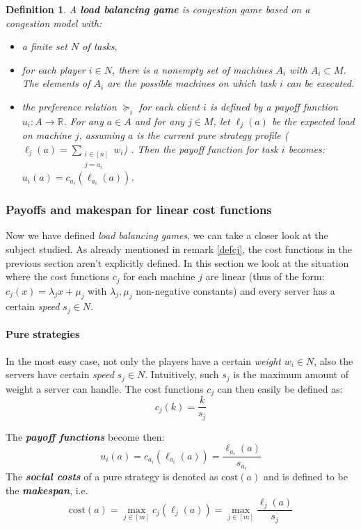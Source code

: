 \documentclass[a4paper,11pt]{article}
\newtheorem{definition}[theorem]{Definition}
\newcommand{\R}{{\mathbb R}}
\newcommand{\cost}{\text{cost}}
\begin{document}
\begin{definition}\cite{9}
A \textbf{load balancing game} is congestion game based on a congestion model with:
\begin{itemize}
  \item a finite set $N$ of tasks,
  \item for each player $i \in N$, there is a nonempty set of machines $A_i$ with $A_i \subset M$. The elements of $A_i$ are the possible machines on which task $i$ can be executed.
  \item the preference relation $\succeq_i$ for each client $i$ is defined by a payoff function $u_i: A \rightarrow \R$. For any $a \in A$ and for any $j \in M$, let $\ell_j(a)$ be \emph{the expected load on machine} $j$, assuming $a$ is the current pure strategy profile ($\ell_j(a) = \sum_{\substack{i \in [n]\\j = a_i}}{w_i}$) . Then the payoff function for task $i$ becomes: $u_i(a) = c_{a_i}(\ell_{a_i}(a))$.


\end{itemize}
\end{definition}


\subsubsection{Payoffs and makespan for linear cost functions}\label{expdefcj}
Now we have defined \emph{load balancing games}, we can take a closer look at the subject studied. As already mentioned in remark \ref{defcj}, the cost functions in the previous section aren't explicitly defined. In this section we look at the situation where the cost functions $c_j$ for each machine $j$ are linear (thus of the form: $c_j(x) = \lambda_jx+\mu_j$ with $\lambda_j, \mu_j$ non-negative constants) and every server has a certain \emph{speed} $s_j \in N$.

\paragraph{Pure strategies}
In the most easy case, not only the players have a certain \emph{weight} $w_i \in N$, also the servers have certain \emph{speed} $s_j \in N$. Intuitively, such $s_j$ is the maximum amount of weight a server can handle. The cost functions $c_j$ can then easily be defined as:
$$c_j(k) = \frac{k}{s_j}$$

 The \textbf{\emph{payoff functions}} become then:
$$u_i(a) = c_{a_i}(\ell_{a_i}(a)) =  \frac{\ell_{a_i}(a)}{s_{a_i}}$$
The \emph{\textbf{social costs}} of a pure strategy is denoted as $\cost(a)$ and is defined to be the \emph{\textbf{makespan}}, i.e. $$\cost(a)=\max_{j\in[m]}{c_j(\ell_j(a))} = \max_{j\in[m]}{\frac{\ell_{j}(a)}{s_{j}}}$$
\end{document}
